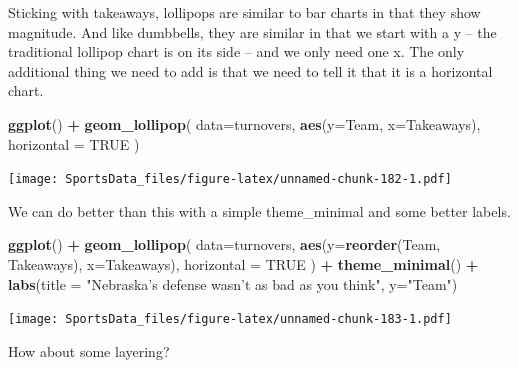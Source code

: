 \documentclass[
]{book}
\newenvironment{Shaded}{\begin{snugshade}}{\end{snugshade}}
\newcommand{\DataTypeTok}[1]{\textcolor[rgb]{0.13,0.29,0.53}{#1}}
\newcommand{\KeywordTok}[1]{\textcolor[rgb]{0.13,0.29,0.53}{\textbf{#1}}}
\newcommand{\NormalTok}[1]{#1}
\newcommand{\OperatorTok}[1]{\textcolor[rgb]{0.81,0.36,0.00}{\textbf{#1}}}
\newcommand{\OtherTok}[1]{\textcolor[rgb]{0.56,0.35,0.01}{#1}}
\newcommand{\StringTok}[1]{\textcolor[rgb]{0.31,0.60,0.02}{#1}}
\begin{document}
Sticking with takeaways, lollipops are similar to bar charts in that they show magnitude. And like dumbbells, they are similar in that we start with a y -- the traditional lollipop chart is on its side -- and we only need one x. The only additional thing we need to add is that we need to tell it that it is a horizontal chart.

\begin{Shaded}
\begin{Highlighting}[]
\KeywordTok{ggplot}\NormalTok{() }\OperatorTok{+}\StringTok{ }
\StringTok{  }\KeywordTok{geom_lollipop}\NormalTok{(}
    \DataTypeTok{data=}\NormalTok{turnovers, }
    \KeywordTok{aes}\NormalTok{(}\DataTypeTok{y=}\NormalTok{Team, }\DataTypeTok{x=}\NormalTok{Takeaways), }
    \DataTypeTok{horizontal =} \OtherTok{TRUE}
\NormalTok{    )}
\end{Highlighting}
\end{Shaded}

\texttt{[image: SportsData\_files/figure-latex/unnamed-chunk-182-1.pdf]}

We can do better than this with a simple theme\_minimal and some better labels.

\begin{Shaded}
\begin{Highlighting}[]
\KeywordTok{ggplot}\NormalTok{() }\OperatorTok{+}\StringTok{ }
\StringTok{  }\KeywordTok{geom_lollipop}\NormalTok{(}
    \DataTypeTok{data=}\NormalTok{turnovers, }
    \KeywordTok{aes}\NormalTok{(}\DataTypeTok{y=}\KeywordTok{reorder}\NormalTok{(Team, Takeaways), }\DataTypeTok{x=}\NormalTok{Takeaways), }
    \DataTypeTok{horizontal =} \OtherTok{TRUE}
\NormalTok{    ) }\OperatorTok{+}\StringTok{ }\KeywordTok{theme_minimal}\NormalTok{() }\OperatorTok{+}\StringTok{ }
\StringTok{  }\KeywordTok{labs}\NormalTok{(}\DataTypeTok{title =} \StringTok{"Nebraska's defense wasn't as bad as you think"}\NormalTok{, }\DataTypeTok{y=}\StringTok{"Team"}\NormalTok{)}
\end{Highlighting}
\end{Shaded}

\texttt{[image: SportsData\_files/figure-latex/unnamed-chunk-183-1.pdf]}

How about some layering?

\begin{Shaded}
\end{Shaded}
\end{document}
